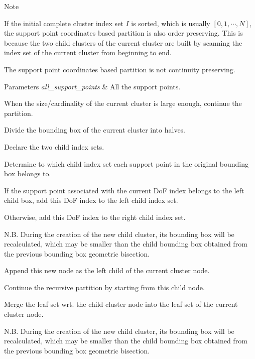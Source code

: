 \begin{DoxyDescription}
\item[Note ]
\begin{DoxyEnumerate}
\item If the initial complete cluster index set $I$ is sorted, which is usually $[0, 1, \cdots, N]$, the support point coordinates based partition is also order preserving. This is because the two child clusters of the current cluster are built by scanning the index set of the current cluster from beginning to end.
\item The support point coordinates based partition is not continuity preserving.  
\end{DoxyEnumerate}
\end{DoxyDescription}


\begin{DoxyParams}{Parameters}
{\em all\+\_\+support\+\_\+points} & All the support points. \\
\hline
\end{DoxyParams}
When the size/cardinality of the current cluster is large enough, continue the partition.

Divide the bounding box of the current cluster into halves.

Declare the two child index sets.

Determine to which child index set each support point in the original bounding box belongs to.

If the support point associated with the current DoF index belongs to the left child box, add this DoF index to the left child index set.

Otherwise, add this DoF index to the right child index set.

N.\+B. During the creation of the new child cluster, its bounding box will be recalculated, which may be smaller than the child bounding box obtained from the previous bounding box geometric bisection.

Append this new node as the left child of the current cluster node.

Continue the recursive partition by starting from this child node.

Merge the leaf set wrt. the child cluster node into the leaf set of the current cluster node.

N.\+B. During the creation of the new child cluster, its bounding box will be recalculated, which may be smaller than the child bounding box obtained from the previous bounding box geometric bisection.

